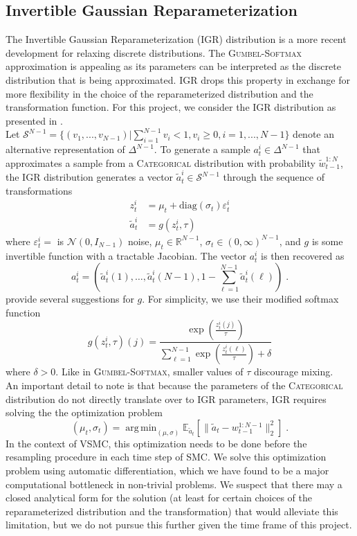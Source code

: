 \documentclass[12pt]{article}
\newcommand{\vsmc}{\textsc{VSMC}\xspace}
\newcommand{\smc}{\textsc{SMC}\xspace}
\newcommand{\categorical}{\textsc{Categorical}\xspace}
\newcommand{\gumbelsoftmax}{\textsc{Gumbel-Softmax}\xspace}
\newcommand{\igr}{\textsc{IGR}\xspace}
\DeclareMathOperator*{\argmin}{arg\,min}
\begin{document}
\subsection{Invertible Gaussian Reparameterization}

The Invertible Gaussian Reparameterization \parencite{Potapczynski:2020} (\igr) distribution is a more recent development for relaxing discrete distributions. The \gumbelsoftmax approximation is appealing as its parameters can be interpreted as the discrete distribution that is being approximated. \igr drops this property in exchange for more flexibility in the choice of the reparameterized distribution and the transformation function. For this project, we consider the \igr distribution as presented in \parencite{Potapczynski:2020}.
\\

Let $\mathcal{S}^{N-1}=\{(v_1,...,v_{N-1})|\sum_{i=1}^{N-1}v_i<1,v_i\geq0, i=1,...,N-1\}$ denote an alternative representation of $\Delta^{N-1}$.
To generate a sample $a_t^i\in\Delta^{N-1}$ that approximates a sample from a \categorical distribution with probability $\tilde{w}_{t-1}^{1:N}$, the \igr distribution generates a vector $\tilde{a}_t^i\in\mathcal{S}^{N-1}$ through the sequence of transformations
\begin{align*}
z_t^i &= \mu_t + \mathrm{diag}(\sigma_t)\varepsilon_t^i \\
\tilde{a}_t^i &= g(z_t^i,\tau)
\end{align*}
where $\varepsilon_t^i=$ is $\mathcal{N}(0,I_{N-1})$ noise, $\mu_t\in\mathbb{R}^{N-1}$, $\sigma_t\in (0,\infty)^{N-1}$, and $g$ is some invertible function with a tractable Jacobian. The vector $a_t^i$ is then recovered as
\[
a_t^i = \left(\tilde{a}_t^i(1), \ldots, \tilde{a}_t^i(N-1), 1-\sum_{\ell=1}^{N-1}\tilde{a}_t^i(\ell)\right) \;.
\]
\textcite{Potapczynski:2020} provide several suggestions for $g$. For simplicity, we use their modified softmax function
\[
g(z_t^i,\tau)(j) = \frac{\exp\left(\frac{z_t^i(j)}{\tau}\right)}{\sum_{\ell=1}^{N-1}\exp\left(\frac{z_t^i(\ell)}{\tau}\right)+\delta}
\]
where $\delta>0$. Like in \gumbelsoftmax, smaller values of $\tau$ discourage mixing.
\\

An important detail to note is that because the parameters of the \categorical distribution do not directly translate over to \igr parameters, \igr requires solving the the optimization problem
\[
(\mu_t,\sigma_t) = \argmin_{(\mu,\sigma)}\mathbb{E}_{\tilde{a}_t}\left[\|\tilde{a}_t-w_{t-1}^{1:N-1}\|_2^2\right] \;.
\]
In the context of \vsmc, this optimization needs to be done before the resampling procedure in each time step of \smc. We solve this optimization problem using automatic differentiation, which we have found to be a major computational bottleneck in non-trivial problems. We suspect that there may a closed analytical form for the solution (at least for certain choices of the reparameterized distribution and the transformation) that would alleviate this limitation, but we do not pursue this further given the time frame of this project.
\end{document}
